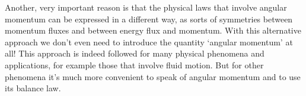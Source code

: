\documentclass[a4paper,12pt,%
onecolumn,oneside,%
british%
]{memoir}
\renewcommand*{\|}[1][]{\nonscript\:#1\vert\nonscript\:\mathopen{}}
\begin{document}
Another, very important reason is that the physical laws that involve angular momentum can be expressed in a different way, as sorts of symmetries between momentum fluxes and between energy flux and momentum. With this alternative approach we don't even need to introduce the quantity \enquote*{angular momentum} at all! This approach is indeed followed for many physical phenomena and applications, for example those that involve fluid motion. But for other phenomena it's much more convenient to speak of angular momentum and to use its balance law.
%
\end{document}
